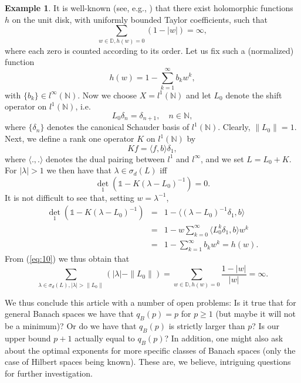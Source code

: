 \documentclass[12pt,a4paper]{article}
\theoremstyle{definition}
\newtheorem {example}[theorem]{Example}
\theoremstyle{remark}
\numberwithin{equation}{section}
\newcommand{\mn}{{\mathbb N}}
\newcommand{\md}{{\mathbb D}}
\begin{document}
\begin{example}
It is well-known (see, e.g., \cite{MR0307393}) that there exist holomorphic functions $h$ on the unit disk, with uniformly bounded Taylor coefficients, such that
\begin{equation}
  \label{eq:10}
\sum_{w \in \md, h(w)=0} (1-|w|) = \infty,  
\end{equation}
where each zero is counted according to its order. Let us fix such a (normalized) function
$$ h(w)=1-\sum_{k=1}^\infty b_k w^k,$$
with $\{ b_k\} \in l^\infty(\mn)$. Now we choose $X=l^1(\mn)$ and let $L_0$ denote the shift operator on $l^1(\mn)$, i.e. 
$$ L_0 \delta_n= \delta_{n+1}, \quad n \in \mn,$$
where $\{\delta_n\}$ denotes the canonical Schauder basis of $l^1(\mn)$.
Clearly, $\|L_0\|=1$. Next, we define a rank one operator $K$ on $l^1(\mn)$ by
$$ Kf = \langle f, b \rangle \delta_1,$$
where $\langle ., . \rangle$ denotes the dual pairing between $l^1$ and $l^\infty$, and we set $L=L_0+K$. For $|\lambda| > 1$ we then have that $\lambda \in \sigma_d(L)$ iff
$$ {\det}_1(\mathds{1}-K(\lambda-L_0)^{-1})=0.$$
It is not difficult to see that, setting $w=\lambda^{-1}$,
\begin{eqnarray*}
{\det}_1(\mathds{1}-K(\lambda-L_0)^{-1}) &=& 1- \langle (\lambda-L_0)^{-1}\delta_1,b \rangle \\
&=& 1- w \sum_{k=0}^\infty \langle L_0^k\delta_1,b \rangle w^k \\
&=& 1- \sum_{k=1}^\infty b_{k} w^k = h(w).
\end{eqnarray*}
From (\ref{eq:10}) we thus obtain that
$$ \sum_{\lambda \in \sigma_d(L), |\lambda|>\|L_0\|} (|\lambda|-\|L_0\|)= \sum_{w \in \md, h(w)=0} \frac{1-|w|}{|w|} = \infty.$$
\end{example} 
We thus conclude this article with a number of open problems: Is it true that for general Banach spaces we have that $q_{{B}}(p)=p$ for $p \geq 1$ (but maybe it will not be a minimum)? Or do we have that $q_{{B}}(p)$ is strictly larger than $p$? Is our upper bound $p+1$ actually equal to $q_{{B}}(p)$? In addition, one might also ask about the optimal exponents for more specific classes of Banach spaces (only the case of Hilbert spaces being known). These are, we believe, intriguing questions for further investigation.
\end{document}
